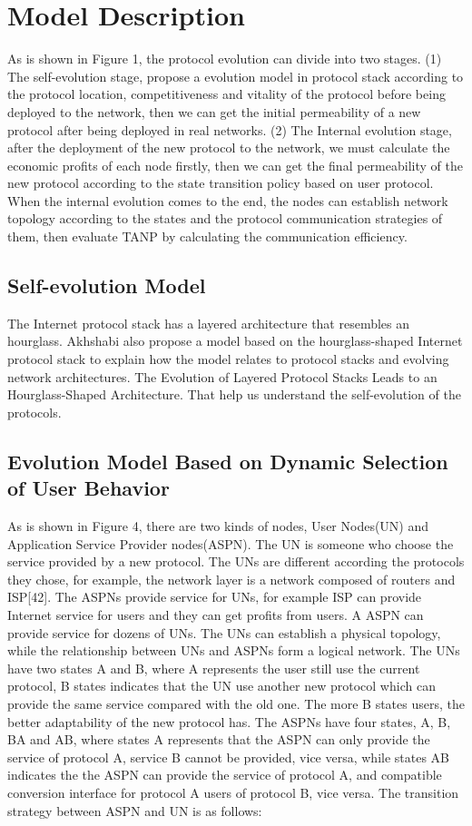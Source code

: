 \documentclass{article}
\begin{document}
\section{Model Description}
As is shown in Figure 1, the protocol evolution can divide into two stages. (1) The self-evolution stage, propose a 
evolution model in protocol stack according to the protocol location, competitiveness and vitality of the protocol 
before being deployed to the network, then we can get the initial permeability of a new protocol after being deployed 
in real networks. (2) The Internal evolution stage, after the deployment of the new protocol to the network, we must 
calculate the economic profits of each node firstly, then we can get the final permeability of the new protocol according to 
the state transition policy based on user protocol. When the internal evolution comes to the end, the nodes can establish 
network topology according to the states and the protocol communication strategies of them,  then evaluate TANP by 
calculating the communication efficiency.
\subsection{Self-evolution Model}
The Internet protocol stack has a layered architecture that resembles an hourglass. Akhshabi also propose a model based on 
the hourglass-shaped Internet protocol stack to explain  how the model relates to protocol stacks and evolving network architectures. 
The Evolution of Layered Protocol Stacks Leads to an Hourglass-Shaped Architecture. That help us understand the self-evolution of the protocols.
\subsection{Evolution Model Based on Dynamic Selection of User Behavior}
As is shown in Figure 4, there are two kinds of nodes, User Nodes(UN) and Application Service Provider nodes(ASPN). 
The UN is someone who choose the service provided by a new protocol. The UNs are different according the protocols they chose,
for example, the network layer is a network composed of routers and ISP[42]. The ASPNs provide service for UNs, 
for example ISP can provide Internet service for users and they can get profits from users. A ASPN can provide service 
for dozens of UNs. The UNs can establish a physical topology, while the relationship between UNs and ASPNs form a logical 
network. The UNs have two states A and B, where A represents the user still use the current protocol, B states indicates 
that the UN use another new protocol which can provide the same service compared with the old one.  The more B states users, 
the better adaptability of the new protocol has. The ASPNs have four states, A, B, BA and AB, where states A represents 
that the ASPN can only provide the service of protocol A, service B cannot be provided, vice versa, while states AB 
indicates the the ASPN can provide the service of protocol A, and compatible conversion interface for protocol A 
users of protocol B, vice versa.
The transition strategy between ASPN and UN is as follows:
\end{document}

